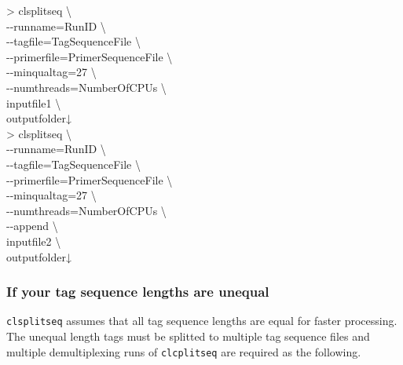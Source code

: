 \documentclass[titlepage,10pt,a4paper,english]{jsbook}
\newenvironment{cmd}{\begin{oframed}\raggedright\ttfamily\footnotesize\setlength{\baselineskip}{1.4em}}{\end{oframed}\vspace{-1em}}
\begin{document}
\begin{cmd}
{\textgreater} clsplitseq {\textbackslash}\\
{-}{-}runname=RunID {\textbackslash}\\
{-}{-}tagfile=TagSequenceFile {\textbackslash}\\
{-}{-}primerfile=PrimerSequenceFile {\textbackslash}\\
{-}{-}minqualtag=27 {\textbackslash}\\
{-}{-}numthreads=NumberOfCPUs {\textbackslash}\\
inputfile1 {\textbackslash}\\
outputfolder↓\\
{\textgreater} clsplitseq {\textbackslash}\\
{-}{-}runname=RunID {\textbackslash}\\
{-}{-}tagfile=TagSequenceFile {\textbackslash}\\
{-}{-}primerfile=PrimerSequenceFile {\textbackslash}\\
{-}{-}minqualtag=27 {\textbackslash}\\
{-}{-}numthreads=NumberOfCPUs {\textbackslash}\\
{-}{-}append {\textbackslash}\\
inputfile2 {\textbackslash}\\
outputfolder↓
\end{cmd}

\subsubsection{If your tag sequence lengths are unequal}
\texttt{clsplitseq} assumes that all tag sequence lengths are equal for faster processing.
The unequal length tags must be splitted to multiple tag sequence files and multiple demultiplexing runs of \texttt{clcplitseq} are required as the following.
\end{document}
